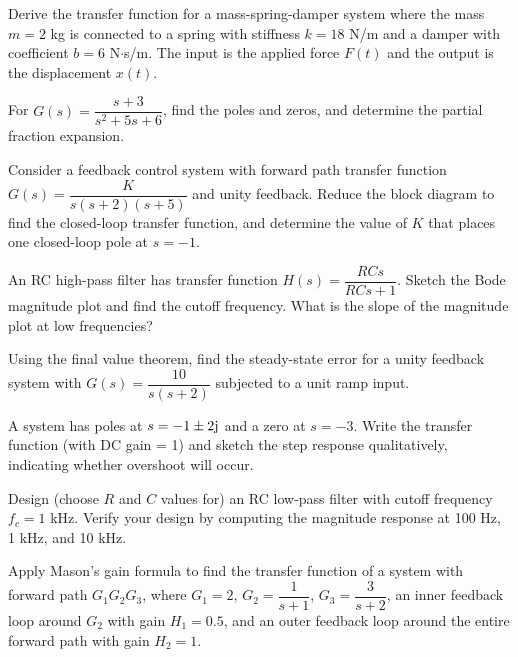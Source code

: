 \begin{exercise}
Derive the transfer function for a mass-spring-damper system where the mass $m = 2$ kg is connected to a spring with stiffness $k = 18$ N/m and a damper with coefficient $b = 6$ N$\cdot$s/m. The input is the applied force $F(t)$ and the output is the displacement $x(t)$.
\end{exercise}

\begin{exercise}
For $G(s) = \dfrac{s+3}{s^2+5s+6}$, find the poles and zeros, and determine the partial fraction expansion.
\end{exercise}

\begin{exercise}
Consider a feedback control system with forward path transfer function $G(s) = \dfrac{K}{s(s+2)(s+5)}$ and unity feedback. Reduce the block diagram to find the closed-loop transfer function, and determine the value of $K$ that places one closed-loop pole at $s = -1$.
\end{exercise}

\begin{exercise}
An RC high-pass filter has transfer function $H(s) = \dfrac{RCs}{RCs+1}$. Sketch the Bode magnitude plot and find the cutoff frequency. What is the slope of the magnitude plot at low frequencies?
\end{exercise}

\begin{exercise}
Using the final value theorem, find the steady-state error for a unity feedback system with $G(s) = \dfrac{10}{s(s+2)}$ subjected to a unit ramp input.
\end{exercise}

\begin{exercise}
A system has poles at $s = -1 \pm 2\mathrm{j}$ and a zero at $s = -3$. Write the transfer function (with DC gain = 1) and sketch the step response qualitatively, indicating whether overshoot will occur.
\end{exercise}

\begin{exercise}
Design (choose $R$ and $C$ values for) an RC low-pass filter with cutoff frequency $f_c = 1$ kHz. Verify your design by computing the magnitude response at 100 Hz, 1 kHz, and 10 kHz.
\end{exercise}

\begin{exercise}
Apply Mason's gain formula to find the transfer function of a system with forward path $G_1 G_2 G_3$, where $G_1 = 2$, $G_2 = \dfrac{1}{s+1}$, $G_3 = \dfrac{3}{s+2}$, an inner feedback loop around $G_2$ with gain $H_1 = 0.5$, and an outer feedback loop around the entire forward path with gain $H_2 = 1$.
\end{exercise}

